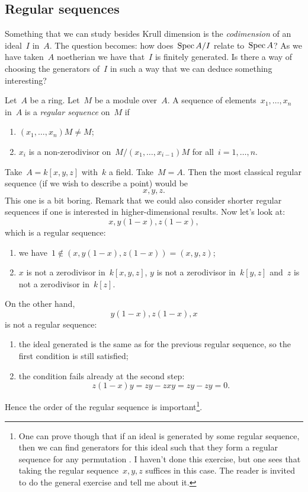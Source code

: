 \documentclass[10pt,a4paper]{article}
\begin{document}
\subsection{Regular sequences}
Something that we can study besides Krull dimension is the \emph{codimension} of an ideal~$I$ in~$A$. The question becomes: how does~$\operatorname{Spec} A/I$ relate to~$\operatorname{Spec} A$? As we have taken~$A$ noetherian we have that~$I$ is finitely generated. Is there a way of choosing the generators of~$I$ in such a way that we can deduce something interesting?
\begin{definition}
  Let~$A$ be a ring. Let~$M$ be a module over~$A$. A sequence of elements~$x_1,\dotsc,x_n$ in~$A$ is a \emph{regular sequence} on~$M$ if
  \begin{enumerate}
    \item $(x_1,\dotsc,x_n)M\neq M$;
    \item $x_i$ is a non-zerodivisor on~$M/(x_1,\dotsc,x_{i-1})M$ for all~$i=1,\dotsc,n$.
  \end{enumerate}
\end{definition}
\begin{example}
  Take~$A=k[x,y,z]$ with~$k$ a field. Take~$M=A$. Then the most classical regular sequence (if we wish to describe a point) would be
  \begin{equation}
    x,y,z.
  \end{equation}
  This one is a bit boring. Remark that we could also consider shorter regular sequences if one is interested in higher-dimensional results. Now let's look at:
  \begin{equation}
    x,y(1-x),z(1-x),
  \end{equation}
  which is a regular sequence:
  \begin{enumerate}
    \item we have~$1\notin(x,y(1-x),z(1-x))=(x,y,z)$;
    \item $x$ is not a zerodivisor in~$k[x,y,z]$, $y$ is not a zerodivisor in~$k[y,z]$ and~$z$ is not a zerodivisor in~$k[z]$.
  \end{enumerate}
  On the other hand,
  \begin{equation}
    y(1-x),z(1-x),x
  \end{equation}
  is not a regular sequence:
  \begin{enumerate}
    \item the ideal generated is the same as for the previous regular sequence, so the first condition is still satisfied;
    \item the condition fails already at the second step:
      \begin{equation}
        z(1-x)y=zy-zxy=zy-zy=0.
      \end{equation}
  \end{enumerate}
  Hence the order of the regular sequence is important\footnote{One can prove though that if an ideal is generated by some regular sequence, then we can find generators for this ideal such that they form a regular sequence for any permutation \cite[exercise 17.6]{eisenbud-commutative-algebra}. I haven't done this exercise, but one sees that taking the regular sequence~$x,y,z$ suffices in this case. The reader is invited to do the general exercise and tell me about it.}.
\end{example}
\end{document}

